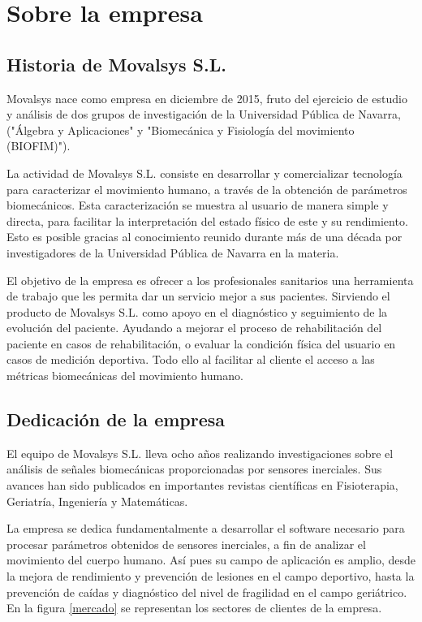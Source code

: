 \chapter{Sobre la empresa}

	\section{Historia de Movalsys S.L.}
	
		Movalsys nace como empresa en diciembre de 2015, fruto del ejercicio de estudio y análisis de dos grupos de investigación de la Universidad Pública de Navarra, ("Álgebra y Aplicaciones" y "Biomecánica y Fisiología del movimiento (BIOFIM)"). 
		
		La actividad de Movalsys S.L. consiste en desarrollar y comercializar tecnología para caracterizar el movimiento humano, a través de la obtención de parámetros biomecánicos. Esta caracterización se muestra al usuario de manera simple y directa, para facilitar la interpretación del estado físico de este y su rendimiento. Esto es posible gracias al conocimiento reunido durante más de una década por investigadores de la Universidad Pública de Navarra en la materia. 
		
		El objetivo de la empresa es ofrecer a los profesionales sanitarios una herramienta de trabajo que les permita dar un servicio mejor a sus pacientes. Sirviendo el producto de Movalsys S.L. como apoyo en el diagnóstico y seguimiento de la evolución del paciente. Ayudando a mejorar el proceso de rehabilitación del paciente en casos de rehabilitación, o evaluar la condición física del usuario en casos de medición deportiva. Todo ello al facilitar al cliente el acceso a las métricas biomecánicas del movimiento humano.
		

	\section{Dedicación de la empresa}
	
		El equipo de Movalsys S.L. lleva ocho años realizando investigaciones sobre el análisis de señales biomecánicas proporcionadas por sensores inerciales. Sus avances han sido publicados en importantes revistas científicas en Fisioterapia, Geriatría, Ingeniería y Matemáticas.
		
		La empresa se dedica fundamentalmente a desarrollar el software necesario para procesar parámetros obtenidos de sensores inerciales, a fin de analizar el movimiento del cuerpo humano. Así pues su campo de aplicación es amplio, desde la mejora de rendimiento y prevención de lesiones en el campo deportivo, hasta la prevención de caídas y diagnóstico del nivel de fragilidad en el campo geriátrico. En la figura \ref{mercado} se representan los sectores de clientes de la empresa.
		

